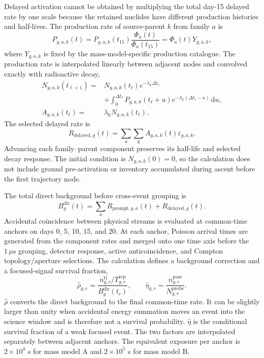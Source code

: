 \documentclass[11pt]{article}
\begin{document}
Delayed activation cannot be obtained by multiplying the total day-15 delayed
rate by one scale because the retained nuclides have different production
histories and half-lives. The production rate of source-parent $k$ from family
$a$ is
\begin{equation}
 P_{g,a,k}(t)
 =P_{g,a,k}(t_{15})\frac{\Phi_a(t)}{\Phi_a(t_{15})}
 =\Phi_a(t)Y_{g,a,k},
 \label{eq:activation_production}
\end{equation}
where $Y_{g,a,k}$ is fixed by the mass-model-specific production catalogue.
The production rate is interpolated linearly between adjacent nodes and
convolved exactly with radioactive decay,
\begin{equation}
 \begin{aligned}
 N_{g,a,k}(t_{\ell+1})={}&N_{g,a,k}(t_\ell)e^{-\lambda_k\Delta t_\ell}\\
 &+\int_0^{\Delta t_\ell}P_{g,a,k}(t_\ell+u)
 e^{-\lambda_k(\Delta t_\ell-u)}\,\mathrm du,\\
 A_{g,a,k}(t_\ell)={}&\lambda_kN_{g,a,k}(t_\ell).
 \end{aligned}
 \label{eq:delayed_inventory}
\end{equation}
The selected delayed rate is
\begin{equation}
 R_{\mathrm{delayed},g}(t)=
 \sum_a\sum_k A_{g,a,k}(t)\varepsilon_{g,a,k}.
 \label{eq:delayed_selected}
\end{equation}
Advancing each family--parent component preserves its half-life and selected
decay response. The initial condition is $N_{g,a,k}(0)=0$, so the calculation
does not include ground pre-activation or inventory accumulated during ascent
before the first trajectory node.

The total direct background before cross-event grouping is
\begin{equation}
 B^{\mathrm{dir}}_g(t)
 =\sum_aR_{\mathrm{prompt},g,a}(t)+R_{\mathrm{delayed},g}(t).
 \label{eq:direct_background_time}
\end{equation}
Accidental coincidence between physical streams is evaluated at common-time
anchors on days 0, 5, 10, 15, and 20. At each anchor, Poisson arrival times are
generated from the component rates and merged onto one time axis before the
$1\,\mu\mathrm{s}$ grouping, detector response, active anticoincidence, and
Compton topology/aperture selections. The calculation defines a background
correction and a focused-signal survival fraction,
\begin{equation}
 \widehat\rho_{g,r}=
 \frac{n^{\mathrm{tl}}_{g,r}/T^{\mathrm{rep}}_{g,r}}
 {B^{\mathrm{dir}}_g(t_r)},\qquad
 \widehat\eta_{g,r}=
 \frac{n^{\mathrm{pass}}_{g,r}}{N^{\mathrm{probe}}_{g,r}}.
 \label{eq:anchor_time_factors}
\end{equation}
$\widehat\rho$ converts the direct background to the final common-time rate.
It can be slightly larger than unity when accidental energy summation moves an
event into the science window and is therefore not a survival probability.
$\widehat\eta$ is the conditional survival fraction of a weak focused event.
The two factors are interpolated separately between adjacent anchors. The
equivalent exposure per anchor is $2\times10^4$ s for mass model A and
$2\times10^5$ s for mass model B.
\end{document}
